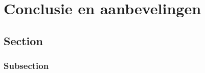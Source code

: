 \chapter{Conclusie en aanbevelingen}
\label{Conclusie_en_aanbevelingen}

\section{Section}

\subsection{Subsection}

